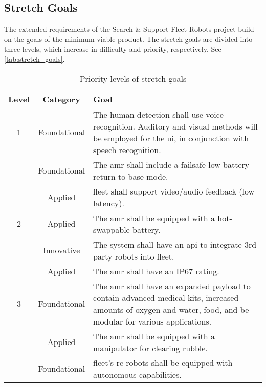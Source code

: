 \subsection{Stretch Goals}
\label{sec:sg}
The extended requirements of the Search \& Support Fleet Robots project build on the goals of the minimum viable product. The stretch goals are divided into three levels, which increase in difficulty and priority, respectively. See \autoref{tab:stretch_goals}.

\begin{table}[H]
    \centering
    \caption{Priority levels of stretch goals}
    \label{tab:stretch_goals}
    \begin{tabular}{|c|c|p{9cm}|}
        \hline
        \textbf{Level} & \textbf{Category} & \textbf{Goal} \\
        \hline
        1 & Foundational & The human detection shall use voice recognition. Auditory and visual methods will be employed for the \gls{ui}, in conjunction with speech recognition. \\
        \cline{2-3}
          & Foundational & The \gls{amr} shall include a failsafe low-battery return-to-base mode. \\
        \cline{2-3}
          & Applied      & \gls{fleet} shall support video/audio feedback (low latency). \\
        \hline
        2 & Applied      & The \gls{amr} shall be equipped with a hot-swappable battery. \\
        \cline{2-3}
          & Innovative   & The system shall have an \gls{api} to integrate 3rd party robots into \gls{fleet}. \\
        \cline{2-3}
          & Applied      & The \gls{amr} shall have an IP67 rating. \\
        \hline
        3 & Foundational & The \gls{amr} shall have an expanded payload to contain advanced medical kits, increased amounts of oxygen and water, food, and be modular for various applications. \\
        \cline{2-3}
          & Applied      & The \gls{amr} shall be equipped with a manipulator for clearing rubble. \\
        \cline{2-3}
          & Foundational & \gls{fleet}’s \gls{rc} robots shall be equipped with autonomous capabilities. \\
        \hline
    \end{tabular}
\end{table}
